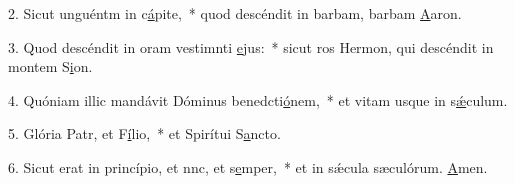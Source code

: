 2. Sicut unguéntm in c\uline{á}pite,~* quod descéndit in barbam, barbam \uline{A}aron.\par 
3. Quod descéndit in oram vestimnti \uline{e}jus:~* sicut ros Hermon, qui descéndit in montem S\uline{i}on.\par 
4. Quóniam illic mandávit Dóminus benedcti\uline{ó}nem,~* et vitam usque in s\uline{ǽ}culum.\par 
5. Glória Patr, et F\uline{í}lio,~* et Spirítui S\uline{a}ncto.\par 
6. Sicut erat in princípio, et nnc, et s\uline{e}mper,~* et in sǽcula sæculórum. \uline{A}men.\par 
